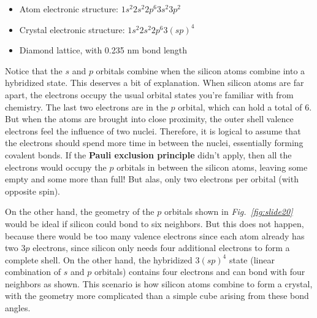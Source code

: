 \vspace{0.25cm}
    \begin{itemize}
        \item{Atom electronic structure: $1s^2 2s^2 2p^6 3s^2 3p^2$}
        \item{Crystal electronic structure: $1s^2 2s^2 2p^6 3(sp)^4$}
        \item{Diamond lattice, with 0.235 nm bond length}
    \end{itemize}
\vspace{0.25cm}

\noindent
Notice that the $s$ and $p$ orbitals combine when the silicon atoms combine into a hybridized state.  This deserves a bit of explanation.  When silicon atoms are far apart, the electrons occupy the usual orbital states you're familiar with from chemistry.  The last two electrons are in the $p$ orbital, which can hold a total of 6.  But when the atoms are brought into close proximity, the outer shell valence electrons feel the influence of two nuclei.  Therefore, it is logical to assume that the electrons should spend more time in between the nuclei, essentially forming covalent bonds.  If the \textbf{Pauli exclusion principle} didn't apply, then all the electrons would occupy the $p$ orbitals in between the silicon atoms, leaving some empty and some more than full!  But alas, only two electrons per orbital (with opposite spin).

On the other hand, the geometry of the $p$ orbitals shown in \emph{Fig.~\ref{fig:slide20}} would be ideal if silicon could bond to six neighbors.  But this does not happen, because there would be too many valence electrons since each atom already has two $3p$ electrons, since silicon only needs four additional electrons to form a complete shell.  On the other hand, the hybridized $3(sp)^4$ state (linear combination of $s$ and $p$ orbitals) contains four electrons and can bond with four neighbors as shown.  This scenario is how silicon atoms combine to form a crystal, with the geometry more complicated than a simple cube  arising from these bond angles.

